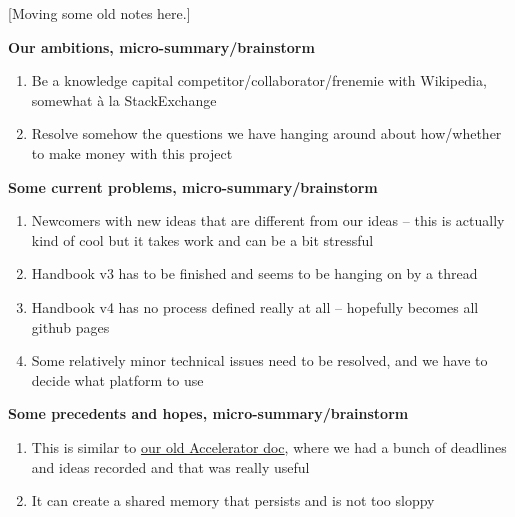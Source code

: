 [Moving some old notes here.]

\textbf{Our ambitions, micro-summary/brainstorm}
\begin{enumerate}
\item Be a knowledge capital competitor/collaborator/frenemie with Wikipedia, somewhat \`a la StackExchange
\item Resolve somehow the questions we have hanging around about how/whether to make money with this project 
\end{enumerate}

\textbf{Some current problems, micro-summary/brainstorm}
\begin{enumerate}
\item Newcomers with new ideas that are different from our ideas -- this is actually kind of cool but it takes work and can be a bit stressful
\item Handbook v3 has to be finished and seems to be hanging on by a thread
\item Handbook v4 has no process defined really at all -- hopefully becomes all github pages
\item Some relatively minor technical issues need to be resolved, and we have to decide what platform to use
\end{enumerate}

\textbf{Some precedents and hopes, micro-summary/brainstorm}
\begin{enumerate}
\item This is similar to \href{https://docs.google.com/document/d/1RZEsqFDwF-jPiCvgWzJgi6n6faTRTDuPQS1CMEeXxRE/edit#heading=h.p197njr3jsn8}{our old Accelerator doc}, where we had a bunch of deadlines and ideas recorded and that was really useful 
\item It can create a shared memory that persists and is not too sloppy
\end{enumerate}
